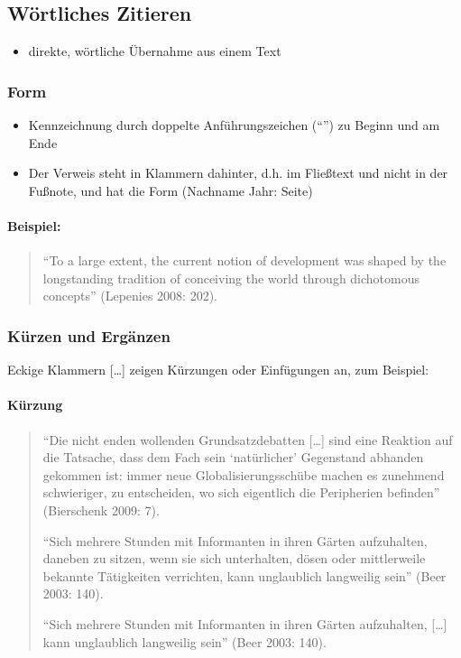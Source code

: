 \documentclass[ 12pt,
                titlepage,
                parskip=half,
                version=first,
                bibliography=totocnumbered,
                final,
                listof=totoc]{scrartcl}
\begin{document}
\subsection{Wörtliches Zitieren}

\begin{itemize}
    \item direkte, wörtliche Übernahme aus einem Text
\end{itemize}

\subsubsection{Form}

\begin{itemize}
    \item Kennzeichnung durch doppelte Anführungszeichen (\enquote{}) zu Beginn
    und am Ende
    \item Der Verweis steht in Klammern dahinter, d.h. im Fließtext und nicht in
    der Fußnote, und hat die Form (Nachname Jahr: Seite)
\end{itemize}

\paragraph{Beispiel:}
\begin{quote}
\enquote{To a large extent, the current notion of development was shaped by the
longstanding tradition of conceiving the world through dichotomous concepts}
(Lepenies 2008: 202).
\end{quote}

\subsubsection{Kürzen und Ergänzen}

Eckige Klammern [\ldots] zeigen Kürzungen oder Einfügungen an, zum Beispiel:

\paragraph{Kürzung}
\begin{quote}
\enquote{Die nicht enden wollenden Grundsatzdebatten [\ldots] sind eine Reaktion
auf die Tatsache, dass dem Fach sein \enquote{natürlicher} Gegenstand abhanden
gekommen ist: immer neue Globalisierungsschübe machen es zunehmend schwieriger,
zu entscheiden, wo sich eigentlich die Peripherien befinden} (Bierschenk 2009:
7).

\enquote{Sich mehrere Stunden mit Informanten in ihren Gärten aufzuhalten,
daneben zu sitzen, wenn sie sich unterhalten, dösen oder mittlerweile bekannte
Tätigkeiten verrichten, kann unglaublich langweilig sein} (Beer 2003: 140).

\enquote{Sich mehrere Stunden mit Informanten in ihren Gärten aufzuhalten,
[\ldots] kann unglaublich langweilig sein} (Beer 2003: 140).
\end{quote}
\end{document}
